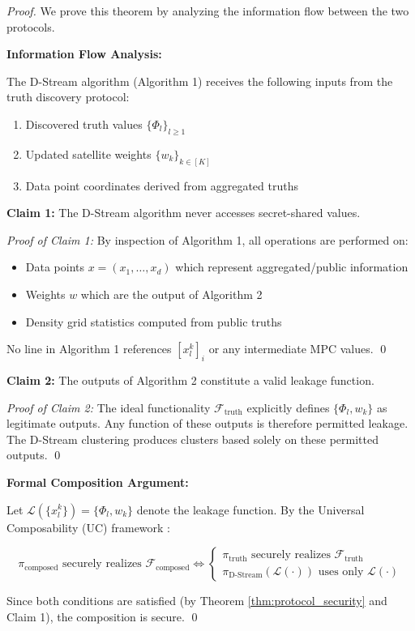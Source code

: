 \begin{proof}
We prove this theorem by analyzing the information flow between the two protocols.

\textbf{Information Flow Analysis:}

The D-Stream algorithm (Algorithm 1) receives the following inputs from the truth discovery protocol:
\begin{enumerate}
    \item Discovered truth values $\{\Phi_l\}_{l \geq 1}$
    \item Updated satellite weights $\{w_k\}_{k \in [K]}$
    \item Data point coordinates derived from aggregated truths
\end{enumerate}

\textbf{Claim 1:} The D-Stream algorithm never accesses secret-shared values.

\textit{Proof of Claim 1:} By inspection of Algorithm 1, all operations are performed on:
\begin{itemize}
    \item Data points $x = (x_1, \ldots, x_d)$ which represent aggregated/public information
    \item Weights $w$ which are the output of Algorithm 2
    \item Density grid statistics computed from public truths
\end{itemize}
No line in Algorithm 1 references $[x_l^k]_i$ or any intermediate MPC values. \qed

\textbf{Claim 2:} The outputs of Algorithm 2 constitute a valid leakage function.

\textit{Proof of Claim 2:} The ideal functionality $\mathcal{F}_{\text{truth}}$ explicitly defines $\{\Phi_l, w_k\}$ as legitimate outputs. Any function of these outputs is therefore permitted leakage. The D-Stream clustering produces clusters based solely on these permitted outputs. \qed

\textbf{Formal Composition Argument:}

Let $\mathcal{L}(\{x_l^k\}) = \{\Phi_l, w_k\}$ denote the leakage function. By the Universal Composability (UC) framework \cite{canetti2000security}:

\begin{equation}
\pi_{\text{composed}} \text{ securely realizes } \mathcal{F}_{\text{composed}} \Leftrightarrow 
\begin{cases}
\pi_{\text{truth}} \text{ securely realizes } \mathcal{F}_{\text{truth}} \\
\pi_{\text{D-Stream}}(\mathcal{L}(\cdot)) \text{ uses only } \mathcal{L}(\cdot)
\end{cases}
\end{equation}

Since both conditions are satisfied (by Theorem \ref{thm:protocol_security} and Claim 1), the composition is secure. \qed
\end{proof}

